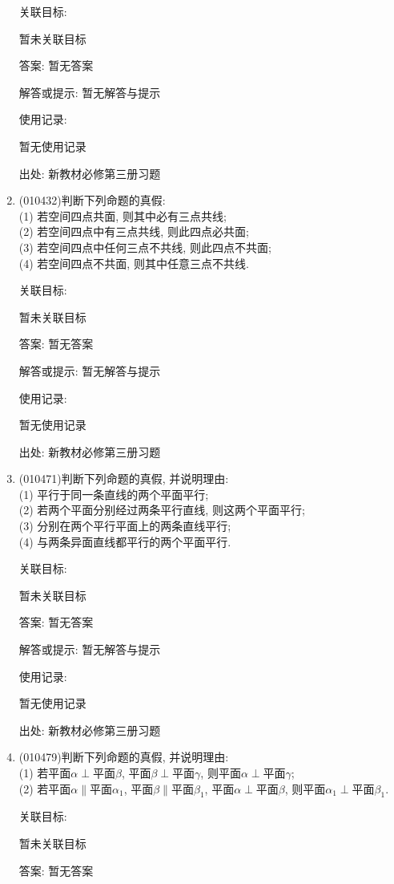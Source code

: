 \documentclass[10pt,a4paper]{article}
\begin{document}
\begin{enumerate}[1.]
关联目标:

暂未关联目标

答案: 暂无答案

解答或提示: 暂无解答与提示

使用记录:

暂无使用记录


出处: 新教材必修第三册习题
\item { (010432)}判断下列命题的真假:\\
(1) 若空间四点共面, 则其中必有三点共线;\\
(2) 若空间四点中有三点共线, 则此四点必共面;\\
(3) 若空间四点中任何三点不共线, 则此四点不共面;\\
(4) 若空间四点不共面, 则其中任意三点不共线.


关联目标:

暂未关联目标

答案: 暂无答案

解答或提示: 暂无解答与提示

使用记录:

暂无使用记录


出处: 新教材必修第三册习题
\item { (010471)}判断下列命题的真假, 并说明理由:\\
(1) 平行于同一条直线的两个平面平行;\\
(2) 若两个平面分别经过两条平行直线, 则这两个平面平行;\\
(3) 分别在两个平行平面上的两条直线平行;\\
(4) 与两条异面直线都平行的两个平面平行.


关联目标:

暂未关联目标

答案: 暂无答案

解答或提示: 暂无解答与提示

使用记录:

暂无使用记录


出处: 新教材必修第三册习题
\item { (010479)}判断下列命题的真假, 并说明理由:\\
(1) 若平面$\alpha\perp$平面$\beta$, 平面$\beta\perp$平面$\gamma$, 则平面$\alpha\perp$平面$\gamma$;\\
(2) 若平面$\alpha\parallel$平面$\alpha_1$, 平面$\beta\parallel$平面$\beta_1$, 平面$\alpha\perp$平面$\beta$, 则平面$\alpha_1\perp$平面$\beta_1$.


关联目标:

暂未关联目标

答案: 暂无答案


\end{enumerate}
\end{document}
